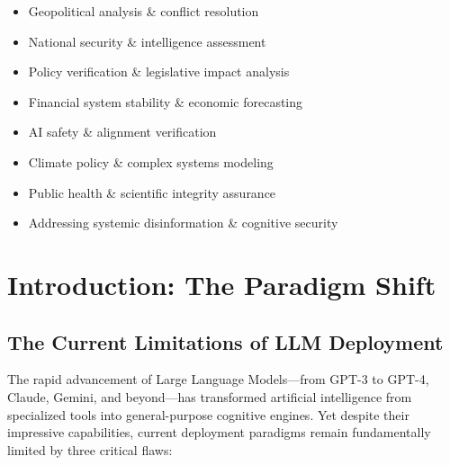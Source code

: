 \documentclass[11pt,a4paper]{article}
\theoremstyle{definition}
\theoremstyle{remark}
\begin{document}
\begin{small}
\begin{center}
\begin{minipage}{0.88\textwidth}
\begin{itemize}[nosep, itemsep=0.2em, topsep=0pt, leftmargin=1.5em]
    \item Geopolitical analysis \& conflict resolution
    \item National security \& intelligence assessment
    \item Policy verification \& legislative impact analysis
    \item Financial system stability \& economic forecasting
    \item AI safety \& alignment verification
    \item Climate policy \& complex systems modeling
    \item Public health \& scientific integrity assurance
    \item Addressing systemic disinformation \& cognitive security
\end{itemize}
\end{minipage}
\end{center}
\end{small}

\clearpage


\section{Introduction: The Paradigm Shift}

\subsection{The Current Limitations of LLM Deployment}

The rapid advancement of Large Language Models—from GPT-3 to GPT-4, Claude, Gemini, and beyond—has transformed artificial intelligence from specialized tools into general-purpose cognitive engines. Yet despite their impressive capabilities, current deployment paradigms remain fundamentally limited by three critical flaws:
\end{document}
